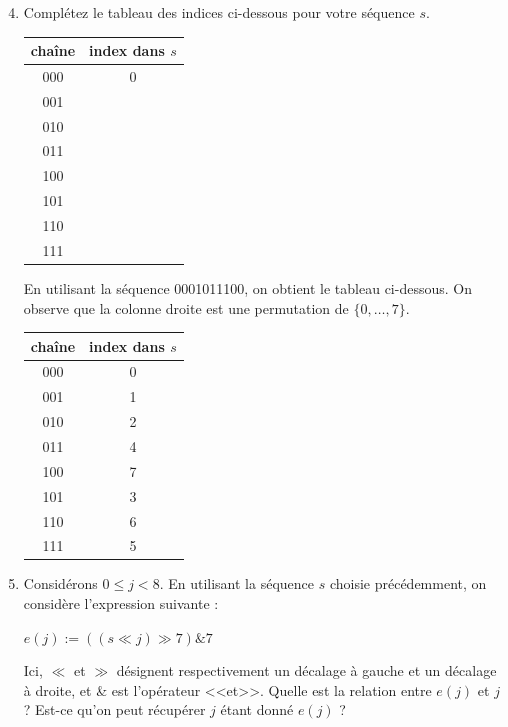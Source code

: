 \documentclass[11pt]{article}
\begin{document}
\begin{enumerate}
\setcounter{enumi}{3}
\item Complétez le tableau des indices ci-dessous pour votre séquence $s$.

\begin{center}
 \begin{tabular}{ c | c }
  chaîne & index dans $s$ \\
  \hline
  000 & 0 \\
  001 & \\
  010 & \\
  011 & \\
  100 & \\
  101 & \\
  110 & \\
  111 & \\
 \end{tabular}
\end{center}


\begin{solution}

 En utilisant la séquence 0001011100, on obtient le tableau ci-dessous.
 On observe que la colonne droite est une permutation de $\{0,\ldots,7\}$.

 \begin{center}
  \begin{tabular}{ c | c }
   chaîne & index dans $s$ \\
   \hline
   000 & 0 \\
   001 & 1 \\
   010 & 2 \\
   011 & 4 \\
   100 & 7 \\
   101 & 3 \\
   110 & 6 \\
   111 & 5 \\
  \end{tabular}
 \end{center}
\end{solution}


 \item Considérons $0 \leq j < 8 $. En utilisant la séquence $s$ choisie
  précédemment, on considère l'expression suivante :

$e(j):=((s \ll j) \gg 7 ) \mathbin{\&} 7$

Ici, $\ll$ et $\gg$ désignent respectivement un décalage à gauche et un
décalage à droite, et \& est l'opérateur <<et>>.
Quelle est la relation entre $e(j)$ et $j$ ? Est-ce qu'on
peut récupérer $j$ étant donné $e(j)$ ?


\end{enumerate}
\end{document}
